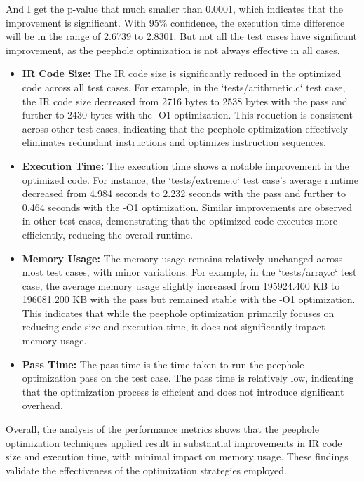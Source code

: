 \documentclass[conference]{IEEEtran}
\begin{document}
And I get the p-value that much smaller than 0.0001, which indicates that the improvement is significant. With 95\% confidence, the execution time difference will be in the range of 2.6739 to 2.8301. But not all the test cases have significant improvement, as the peephole optimization is not always effective in all cases.

\begin{itemize}
	\item \textbf{IR Code Size:} The IR code size is significantly reduced in the optimized code across all test cases. For example, in the `tests/arithmetic.c` test case, the IR code size decreased from 2716 bytes to 2538 bytes with the pass and further to 2430 bytes with the -O1 optimization. This reduction is consistent across other test cases, indicating that the peephole optimization effectively eliminates redundant instructions and optimizes instruction sequences.

	\item \textbf{Execution Time:} The execution time shows a notable improvement in the optimized code. For instance, the `tests/extreme.c` test case's average runtime decreased from 4.984 seconds to 2.232 seconds with the pass and further to 0.464 seconds with the -O1 optimization. Similar improvements are observed in other test cases, demonstrating that the optimized code executes more efficiently, reducing the overall runtime.

	\item \textbf{Memory Usage:} The memory usage remains relatively unchanged across most test cases, with minor variations. For example, in the `tests/array.c` test case, the average memory usage slightly increased from 195924.400 KB to 196081.200 KB with the pass but remained stable with the -O1 optimization. This indicates that while the peephole optimization primarily focuses on reducing code size and execution time, it does not significantly impact memory usage.
	\item{\textbf{Pass Time:} The pass time is the time taken to run the peephole optimization pass on the test case. The pass time is relatively low, indicating that the optimization process is efficient and does not introduce significant overhead.}
\end{itemize}

Overall, the analysis of the performance metrics shows that the peephole optimization techniques applied result in substantial improvements in IR code size and execution time, with minimal impact on memory usage. These findings validate the effectiveness of the optimization strategies employed.
\end{document}
